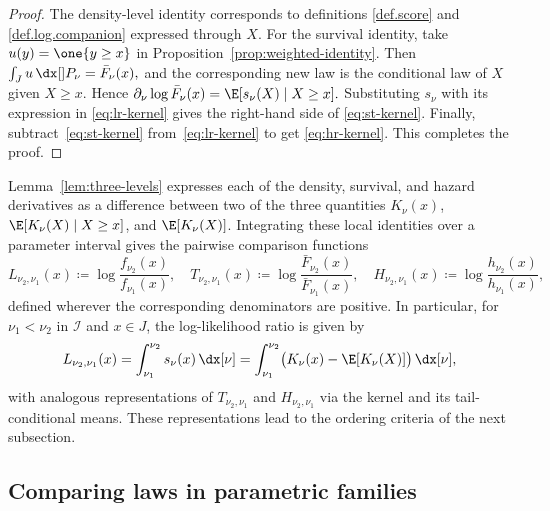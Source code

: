 \documentclass[11pt]{article}
\begin{document}
\begin{proof}
The density-level identity corresponds to definitions \eqref{def.score} and \eqref{def.log.companion} expressed through $X$. For the survival identity, take \(u(y)=\one\{y\ge x\}\) in Proposition~\ref{prop:weighted-identity}. Then $\int_J u\,\dx[]P_\nu=\bar F_\nu(x),$
and the corresponding new law is the conditional law of \(X\) given \(X\ge x\). Hence $\partial_\nu\log\bar F_\nu(x) =\E[s_\nu(X)\mid X\ge x].$ Substituting \(s_\nu\) with its expression in \eqref{eq:lr-kernel} gives the right-hand side of \eqref{eq:st-kernel}. 
Finally, subtract~\eqref{eq:st-kernel} from~\eqref{eq:lr-kernel} to get \eqref{eq:hr-kernel}. This completes the proof.
\end{proof}



Lemma~\ref{lem:three-levels} expresses each of the density, survival, and hazard derivatives as a difference between two of the three quantities \(K_\nu(x)\), \(\E[K_\nu(X)\mid X\ge x]\), and \(\E[K_\nu(X)]\). Integrating these local identities over a parameter interval gives the pairwise comparison functions
\[
L_{\nu_2,\nu_1}(x) \coloneqq \log\frac{f_{\nu_2}(x)}{f_{\nu_1}(x)},\quad T_{\nu_2,\nu_1}(x) \coloneqq \log\frac{\bar F_{\nu_2}(x)}{\bar F_{\nu_1}(x)}, \quad H_{\nu_2,\nu_1}(x) \coloneqq \log\frac{h_{\nu_2}(x)}{h_{\nu_1}(x)},
\]
defined wherever the corresponding denominators are positive. In particular, for $\nu_1<\nu_2$ in \(\mathcal I\) and $x\in J$, the log-likelihood ratio is given by
\begin{equation}\label{eq:pair-density-int}
L_{\nu_2,\nu_1}(x) =\int_{\nu_1}^{\nu_2}s_\nu(x)\,\dx[\nu] =\int_{\nu_1}^{\nu_2} \bigl(K_\nu(x)-\E[K_\nu(X)]\bigr)\,\dx[\nu],
\end{equation}
with analogous representations of $T_{\nu_2,\nu_1}$ and $H_{\nu_2,\nu_1}$ via the kernel and its tail-conditional means. These representations lead to the ordering criteria of the next subsection.



\subsection{Comparing laws in parametric families}\label{subsec:one-parameter-criteria}
\end{document}

